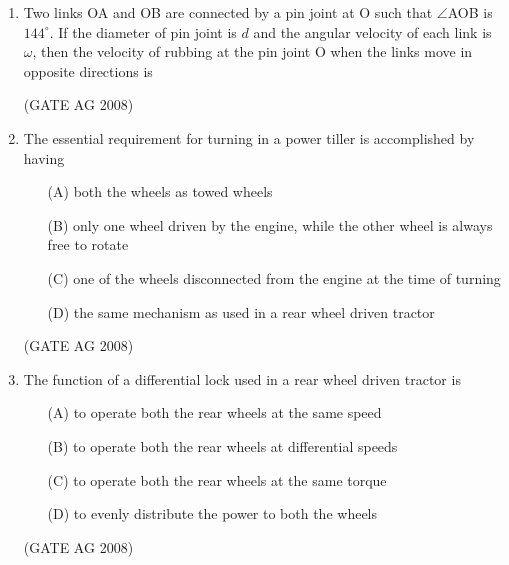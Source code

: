 \documentclass[journal,12pt,onecolumn]{IEEEtran}
\begin{document}
\begin{enumerate}
\item 
 Two links OA and OB are connected by a pin joint at O such that $\angle$AOB is $144^\circ$. If the diameter of pin joint is $d$ and the angular velocity of each link is $\omega$, then the velocity of rubbing at the pin joint O when the links move in opposite directions is 
\begin{enumerate}
\end{enumerate}
\hfill(GATE AG 2008)\\

\medskip

\item 
 The essential requirement for turning in a power tiller is accomplished by having 
\begin{enumerate}
\item[(A)]  both the wheels as towed wheels
\item[(B)]  only one wheel driven by the engine, while the other wheel is always free to rotate
\item[(C)]  one of the wheels disconnected from the engine at the time of turning
\item[(D)]  the same mechanism as used in a rear wheel driven tractor
\end{enumerate}
\hfill(GATE AG 2008)\\

\medskip

\item 
 The function of a differential lock used in a rear wheel driven tractor is 
\begin{enumerate}
\item[(A)]  to operate both the rear wheels at the same speed 
\item[(B)]  to operate both the rear wheels at differential speeds 
\item[(C)]  to operate both the rear wheels at the same torque 
\item[(D)] to evenly distribute the power to both the wheels 
\end{enumerate}
\hfill(GATE AG 2008)\\


\end{enumerate}
\end{document}
